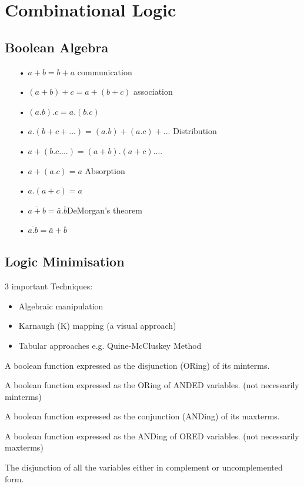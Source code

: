 \documentclass[a4paper]{article}
\begin{document}
\maketitle

\tableofcontents

\section{Combinational Logic}
\subsection{Boolean Algebra}
\begin{itemize}
\item[•] $a+b=b+a$ \hfill{communication}
\item[•] $(a+b)+c=a+(b+c)$ \hfill{association}
\item[•] $(a.b).c=a.(b.c)$
\item[•] $a.(b+c+...)=(a.b)+(a.c)+...$ \hfill{Distribution}
\item[•] $a+(b.c....)=(a+b).(a+c)....$
\item[•] $a+(a.c)=a$ \hfill{Absorption}
\item[•] $a.(a+c)=a$
\item[•] $\overline{a+b}=\bar{a}.\bar{b}$\hfill{DeMorgan's theorem}
\item[•] $\overline{a.b}=\bar{a}+\bar{b}$
\end{itemize}

\subsection{Logic Minimisation}

3 important Techniques:\\
\begin{itemize}
\item Algebraic manipulation
\item Karnaugh (K) mapping (a visual approach)
\item Tabular approaches e.g. Quine-McCluskey Method
\end{itemize} 

\begin{defi}
A boolean function expressed as the disjunction (ORing) of its minterms.
\end{defi}
\begin{defi}
A boolean function expressed as the ORing of ANDED variables. (not necessarily minterms)
\end{defi}
\begin{defi}
A boolean function expressed as the conjunction (ANDing) of its maxterms.
\end{defi}
\begin{defi}
A boolean function expressed as the ANDing of ORED variables. (not necessarily maxterms)
\end{defi}
\begin{defi}[Maxterms]
The disjunction of all the variables either in complement or uncomplemented form.
\end{defi}
\end{document}
